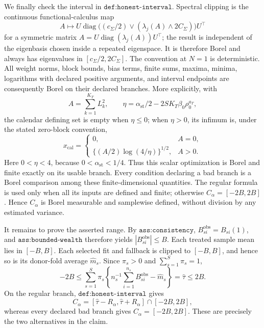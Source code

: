 We finally check the interval in \(\texttt{def:honest-interval}\).  Spectral clipping is the continuous functional-calculus map
\[
 A\longmapsto U\operatorname{diag}
 \bigl((c_\Sigma/2)\vee(\lambda_j(A)\wedge2C_\Sigma)\bigr)U^\top
\]
for a symmetric matrix \(A=U\operatorname{diag}(\lambda_j(A))U^\top\); the result is independent of the eigenbasis chosen inside a repeated eigenspace.  It is therefore Borel and always has eigenvalues in \([c_\Sigma/2,2C_\Sigma]\).  The convention at \(N=1\) is deterministic.  All weight norms, block bounds, bias terms, finite sums, maxima, minima, logarithms with declared positive arguments, and interval endpoints are consequently Borel on their declared branches.  More explicitly, with
\[
 A=\sum_{k=1}^{K_T}L_k^2,
 \qquad
 \eta=\alpha_{\mathrm{st}}/2-2SK_T\beta_0\rho_0^{a_T},
\]
the calendar defining set is empty when \(\eta\le0\); when \(\eta>0\), its infimum is, under the stated zero-block convention,
\[
 x_{\mathrm{cal}}=
 \begin{cases}
 0,&A=0,\\
 \{(A/2)\log(4/\eta)\}^{1/2},&A>0.
 \end{cases}
\]
Here \(0<\eta<4\), because \(0<\alpha_{\mathrm{st}}<1/4\).  Thus this scalar optimization is Borel and finite exactly on its usable branch.  Every condition declaring a bad branch is a Borel comparison among these finite-dimensional quantities.  The regular formula is used only when all its inputs are defined and finite; otherwise \(C_\alpha=[-2B,2B]\).  Hence \(C_\alpha\) is Borel measurable and samplewise defined, without division by any estimated variance.

It remains to prove the asserted range.  By \(\texttt{ass:consistency}\), \(B_{si}^{\mathrm{obs}}=B_{si}(1)\), and \(\texttt{ass:bounded-wealth}\) therefore yields \(|B_{si}^{\mathrm{obs}}|\le B\).  Each treated sample mean lies in \([-B,B]\).  Each selected fit and fallback is clipped to \([-B,B]\), and hence so is its donor-fold average \(\widehat m_s\).  Since \(\pi_s>0\) and \(\sum_{s=1}^S\pi_s=1\),
\[
 -2B
 \le\sum_{s=1}^S\pi_s
 \left\{n_s^{-1}\sum_{i=1}^{n_s}B_{si}^{\mathrm{obs}}-\widehat m_s\right\}
 =\widehat\tau
 \le2B.
\]
On the regular branch, \(\texttt{def:honest-interval}\) gives
\[
 C_\alpha=[\widehat\tau-R_\alpha,\widehat\tau+R_\alpha]\cap[-2B,2B],
\]
whereas every declared bad branch gives \(C_\alpha=[-2B,2B]\).  These are precisely the two alternatives in the claim.
